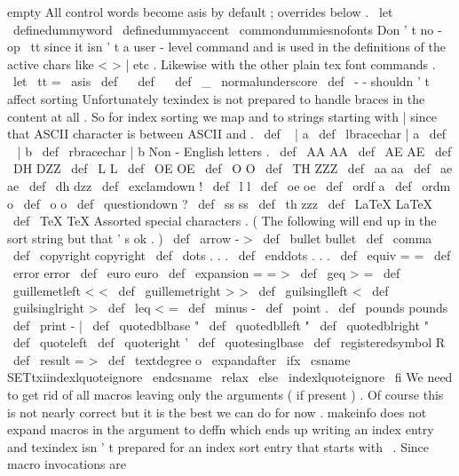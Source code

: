 {{{{{{empty
}
%
%
All
control
words
become
asis
by
default
;
overrides
below
.
\
let
\
definedummyword
\
definedummyaccent
%
\
commondummiesnofonts
%
%
Don
'
t
no
-
op
\
tt
since
it
isn
'
t
a
user
-
level
command
%
and
is
used
in
the
definitions
of
the
active
chars
like
<
>
|
etc
.
%
Likewise
with
the
other
plain
tex
font
commands
.
%
\
let
\
tt
=
\
asis
%
\
def
\
{
}
%
\
def
\
{
}
%
\
def
\
_
{
\
normalunderscore
}
%
\
def
\
-
{
}
%
-
shouldn
'
t
affect
sorting
%
%
Unfortunately
texindex
is
not
prepared
to
handle
braces
in
the
%
content
at
all
.
So
for
index
sorting
we
map
{
and
}
to
strings
%
starting
with
|
since
that
ASCII
character
is
between
ASCII
{
and
}
.
\
def
\
{
{
|
a
}
%
\
def
\
lbracechar
{
|
a
}
%
%
\
def
\
}
{
|
b
}
%
\
def
\
rbracechar
{
|
b
}
%
%
%
Non
-
English
letters
.
\
def
\
AA
{
AA
}
%
\
def
\
AE
{
AE
}
%
\
def
\
DH
{
DZZ
}
%
\
def
\
L
{
L
}
%
\
def
\
OE
{
OE
}
%
\
def
\
O
{
O
}
%
\
def
\
TH
{
ZZZ
}
%
\
def
\
aa
{
aa
}
%
\
def
\
ae
{
ae
}
%
\
def
\
dh
{
dzz
}
%
\
def
\
exclamdown
{
!
}
%
\
def
\
l
{
l
}
%
\
def
\
oe
{
oe
}
%
\
def
\
ordf
{
a
}
%
\
def
\
ordm
{
o
}
%
\
def
\
o
{
o
}
%
\
def
\
questiondown
{
?
}
%
\
def
\
ss
{
ss
}
%
\
def
\
th
{
zzz
}
%
%
\
def
\
LaTeX
{
LaTeX
}
%
\
def
\
TeX
{
TeX
}
%
%
%
Assorted
special
characters
.
%
(
The
following
{
}
will
end
up
in
the
sort
string
but
that
'
s
ok
.
)
\
def
\
arrow
{
-
>
}
%
\
def
\
bullet
{
bullet
}
%
\
def
\
comma
{
}
%
\
def
\
copyright
{
copyright
}
%
\
def
\
dots
{
.
.
.
}
%
\
def
\
enddots
{
.
.
.
}
%
\
def
\
equiv
{
=
=
}
%
\
def
\
error
{
error
}
%
\
def
\
euro
{
euro
}
%
\
def
\
expansion
{
=
=
>
}
%
\
def
\
geq
{
>
=
}
%
\
def
\
guillemetleft
{
<
<
}
%
\
def
\
guillemetright
{
>
>
}
%
\
def
\
guilsinglleft
{
<
}
%
\
def
\
guilsinglright
{
>
}
%
\
def
\
leq
{
<
=
}
%
\
def
\
minus
{
-
}
%
\
def
\
point
{
.
}
%
\
def
\
pounds
{
pounds
}
%
\
def
\
print
{
-
|
}
%
\
def
\
quotedblbase
{
"
}
%
\
def
\
quotedblleft
{
"
}
%
\
def
\
quotedblright
{
"
}
%
\
def
\
quoteleft
{
}
%
\
def
\
quoteright
{
'
}
%
\
def
\
quotesinglbase
{
}
%
\
def
\
registeredsymbol
{
R
}
%
\
def
\
result
{
=
>
}
%
\
def
\
textdegree
{
o
}
%
%
\
expandafter
\
ifx
\
csname
SETtxiindexlquoteignore
\
endcsname
\
relax
\
else
\
indexlquoteignore
\
fi
%
%
We
need
to
get
rid
of
all
macros
leaving
only
the
arguments
(
if
present
)
.
%
Of
course
this
is
not
nearly
correct
but
it
is
the
best
we
can
do
for
now
.
%
makeinfo
does
not
expand
macros
in
the
argument
to
deffn
which
ends
up
%
writing
an
index
entry
and
texindex
isn
'
t
prepared
for
an
index
sort
entry
%
that
starts
with
\
.
%
%
Since
macro
invocations
are
}}}}}

